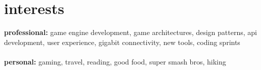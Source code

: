 \documentclass[]{friggeri-cv} %
\begin{document}

\section{interests}

\textbf{professional:} game engine development, game architectures, design patterns, api development,  user experience, gigabit connectivity, new tools, coding sprints \\
\\
\textbf{personal:} gaming, travel, reading, good food, super smash bros, hiking
\end{document}

